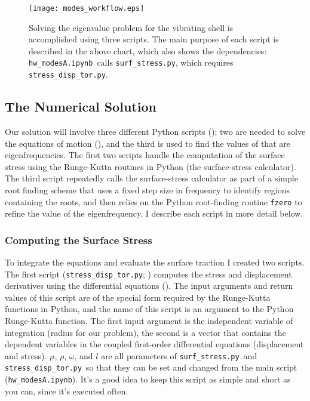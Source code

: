 \documentclass[11pt,titlepage,fleqn]{article}
\newcommand{\tfileA}{{\tt hw\_modesA.ipynb}}
\newcommand{\tfileB}{{\tt surf\_stress.py}}
\newcommand{\tfileC}{{\tt stress\_disp\_tor.py}}
\begin{document}

\begin{figure}[h]
\centering
\texttt{[image: modes\_workflow.eps]}
\caption[]
{{
Solving the eigenvalue problem for the vibrating shell is accomplished using three scripts. The main purpose of each script is described in the above chart, which also shows the dependencies: \tfileA\ calls \tfileB, which requires \tfileC.
\label{fig:workflow}
}}
\end{figure}


\subsection{The Numerical Solution}

Our solution will involve three different Python scripts (); two are needed to solve the equations of motion (), and the third is used to find the values of that are eigenfrequencies. The first two scripts handle the computation of the surface stress using the Runge-Kutta routines in Python (the surface-stress calculator). The third script repeatedly calls the surface-stress calculator as part of a simple root finding scheme that uses a fixed step size in frequency to identify regions containing the roots, and then relies on the Python root-finding routine \verb+fzero+ to refine the value of the eigenfrequency. I describe each script in more detail below.

\subsubsection{Computing the Surface Stress}

To integrate the equations and evaluate the surface traction I created two scripts. The first script (\tfileC; ) computes the stress and displacement derivatives using the differential equations (). The input arguments and return values of this script are of the special form required by the Runge-Kutta functions in Python, and the name of this script is an argument to the Python Runge-Kutta function. The first input argument is the independent variable of integration (radius for our problem), the second is a vector that contains the dependent variables in the coupled first-order differential equations (displacement and stress). $\mu$, $\rho$, $\omega$, and $l$ are all parameters of \tfileB\ and \tfileC\ so that they can be set and changed from the main script (\tfileA). It's a good idea to keep this script as simple and short as you can, since it's executed often.
\end{document}

